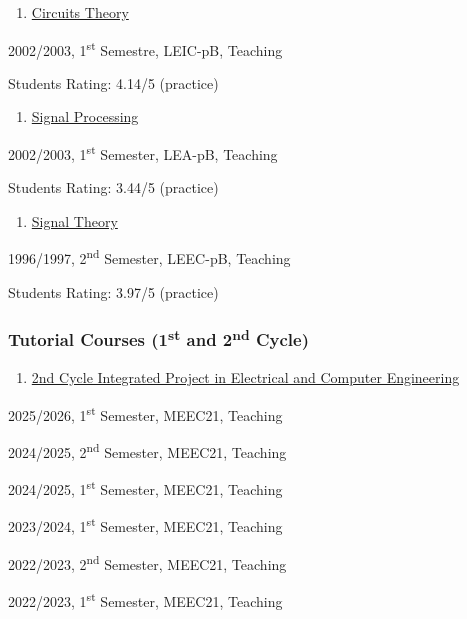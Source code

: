 \documentclass[
]{article}
\begin{document}
\begin{enumerate}
\def\labelenumi{\arabic{enumi}.}
\setcounter{enumi}{18}
\item
  \ul{Circuits Theory}
\end{enumerate}

2002/2003, 1\textsuperscript{st} Semestre, LEIC-pB, Teaching

Students Rating: 4.14/5 (practice)

\begin{enumerate}
\def\labelenumi{\arabic{enumi}.}
\setcounter{enumi}{19}
\item
  \ul{Signal Processing}
\end{enumerate}

2002/2003, 1\textsuperscript{st} Semester, LEA-pB, Teaching

Students Rating: 3.44/5 (practice)

\begin{enumerate}
\def\labelenumi{\arabic{enumi}.}
\setcounter{enumi}{20}
\item
  \ul{Signal Theory}
\end{enumerate}

1996/1997, 2\textsuperscript{nd} Semester, LEEC-pB, Teaching

Students Rating: 3.97/5 (practice)

\subsubsection{\texorpdfstring{Tutorial Courses (1\textsuperscript{st}
and 2\textsuperscript{nd}
Cycle)}{Tutorial Courses (1st and 2nd Cycle)}}\label{tutorial-courses-1st-and-2nd-cycle}

\begin{enumerate}
\def\labelenumi{\arabic{enumi}.}
\setcounter{enumi}{21}
\item
  \ul{2nd Cycle Integrated Project in Electrical and Computer
  Engineering}
\end{enumerate}

2025/2026, 1\textsuperscript{st} Semester, MEEC21, Teaching

2024/2025, 2\textsuperscript{nd} Semester, MEEC21, Teaching

2024/2025, 1\textsuperscript{st} Semester, MEEC21, Teaching

2023/2024, 1\textsuperscript{st} Semester, MEEC21, Teaching

2022/2023, 2\textsuperscript{nd} Semester, MEEC21, Teaching

2022/2023, 1\textsuperscript{st} Semester, MEEC21, Teaching
\end{document}
